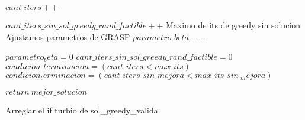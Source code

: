 \begin{algorithmic}[1]
            	
        \EndIf

        \State $cant\_iters++$
    
        \Else
        \State $cant\_iters\_sin\_sol\_greedy\_rand\_factible++$
        	\Comment Maximo de its de greedy sin solucion
                    	\Comment Ajustamos parametros de GRASP
                        \State $parametro\_beta--$
                    \EndIf

            	\State $parametro_beta = 0$
        	\EndIf
        	\State $cant\_iters\_sin\_sol\_greedy\_rand\_factible = 0$
        \EndIf
        \EndIf
           \State $condicion\_terminacion = (cant\_iters < max\_its)$            
            \State $condicion_terminacion = (cant\_iters\_sin\_mejora < max\_its\_sin\ _mejora)$
        \EndIf

       \EndWhile

       \State $return\:  mejor\_solucion$

\EndProcedure
\end{algorithmic}

Arreglar el if turbio de sol_greedy_valida